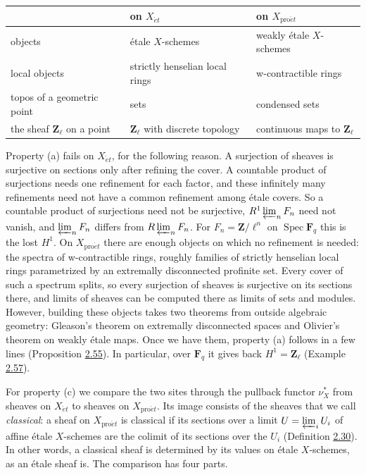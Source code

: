 \documentclass[11pt]{article}
\begin{document}
\begin{center}\small
\begin{tabularx}{\linewidth}{>{\raggedright\arraybackslash}X>{\raggedright\arraybackslash}X>{\raggedright\arraybackslash}X}
\toprule
 & on \(X_{\acute{e}t}\) & on \(X_{\mathrm{pro}\acute{e}t}\) \\
\midrule
objects & étale \(X\)-schemes & weakly étale \(X\)-schemes \\
local objects & strictly henselian local rings & w-contractible rings \\
topos of a geometric point & sets & condensed sets \\
the sheaf \(\mathbf Z_\ell\) on a point & \(\mathbf Z_\ell\) with discrete topology & continuous maps to \(\mathbf Z_\ell\) \\
\bottomrule
\end{tabularx}
\end{center}

Property (a) fails on \(X_{\acute{e}t}\), for the following reason. A surjection of sheaves is surjective on sections only after refining the cover. A countable product of surjections needs one refinement for each factor, and these infinitely many refinements need not have a common refinement among étale covers. So a countable product of surjections need not be surjective, \(R^1\varprojlim_nF_n\) need not vanish, and \(\varprojlim_nF_n\) differs from \(R\varprojlim_nF_n\). For \(F_n=\mathbf Z/\ell^n\) on \(\operatorname{Spec}\mathbf F_q\) this is the lost \(H^1\). On \(X_{\mathrm{pro}\acute{e}t}\) there are enough objects on which no refinement is needed: the spectra of w-contractible rings, roughly families of strictly henselian local rings parametrized by an extremally disconnected profinite set. Every cover of such a spectrum splits, so every surjection of sheaves is surjective on its sections there, and limits of sheaves can be computed there as limits of sets and modules. However, building these objects takes two theorems from outside algebraic geometry: Gleason's theorem on extremally disconnected spaces and Olivier's theorem on weakly étale maps. Once we have them, property (a) follows in a few lines (Proposition \hyperref[bp170]{2.55}). In particular, over \(\mathbf F_q\) it gives back \(H^1=\mathbf Z_\ell\) (Example \hyperref[bp176]{2.57}).

For property (c) we compare the two sites through the pullback functor \(\nu_X^*\) from sheaves on \(X_{\acute{e}t}\) to sheaves on \(X_{\mathrm{pro}\acute{e}t}\). Its image consists of the sheaves that we call \emph{classical}: a sheaf on \(X_{\mathrm{pro}\acute{e}t}\) is classical if its sections over a limit \(U=\varprojlim_iU_i\) of affine étale \(X\)-schemes are the colimit of its sections over the \(U_i\) (Definition \hyperref[bp89]{2.30}). In other words, a classical sheaf is determined by its values on étale \(X\)-schemes, as an étale sheaf is. The comparison has four parts.
\end{document}
